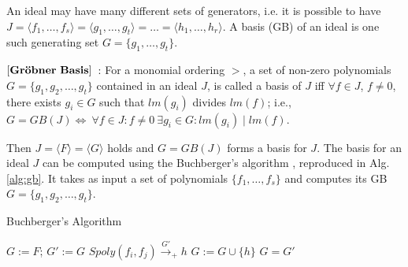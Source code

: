 An ideal may have many different sets of generators, i.e. it is
possible to have $J = \langle f_1, \dots, f_s\rangle = \langle g_1,
\dots, g_t \rangle = \dots = \langle h_1,\dots, h_r\rangle$. A
\Grobner basis (GB) of an ideal is one such generating set
$G=\{g_1, \dots, g_t\}$.

\begin{Definition}
\label{def:gb}
$\bf{\left[Gr\ddot{o}bner\ Basis\right]}$~\cite{gb_book}: 
For a monomial ordering $>$, a set  of non-zero polynomials $G =
\{g_1,g_2,\dots,g_t\}$ contained in an ideal $J$, is called a
\Grobner basis of $J$ iff 
$\forall f \in J$, $f\neq 0$, there exists $g_i\in G$ 
such that $lm(g_i)$ divides $lm(f)$; i.e., $G = GB(J)
\Leftrightarrow\  \forall f \in J : f \neq 0 \ \exists g_i \in G :
lm(g_i)\mid lm(f)$.  
\end{Definition}

Then $J = \langle F \rangle = \langle G \rangle$ holds and $G=GB(J)$
forms a basis for $J$. The \Grobner basis for an ideal $J$ can be
computed using the  Buchberger's algorithm \cite{buchberger_thesis},
reproduced in Alg. \ref{alg:gb}. 
It takes as input a set of polynomials $\{f_1,\dots, f_s\}$ and
computes its GB $G = \{g_1,g_2,\dots,g_t\}$. 
\vspace{0.1in}
\begin{algorithm}
\caption {Buchberger's Algorithm}
\label{alg:gb}
\begin{algorithmic}[1]
 \State $G:= F$;
 \Repeat
    \State $G' := G$
      \State $Spoly(f_i, f_j) \stackrel{G'}{\textstyle\longrightarrow}_+h$ 
       \State $G:= G \cup \{h\}$ \EndIf
    \EndFor
 \Until $G = G'$
 \EndProcedure
\end{algorithmic}
\end{algorithm}


